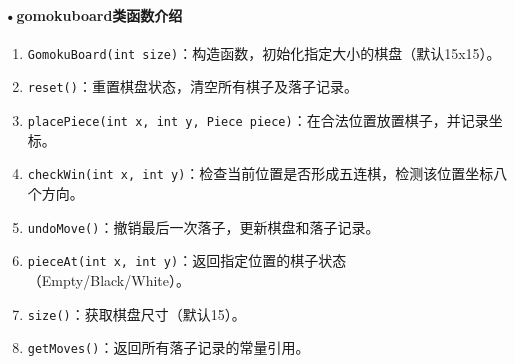 \documentclass[UTF8]{ctexart}
\begin{document}
\paragraph{•gomokuboard类函数介绍}
\begin{enumerate}
    \item \texttt{GomokuBoard(int size)}：构造函数，初始化指定大小的棋盘（默认15x15）。
    \item \texttt{reset()}：重置棋盘状态，清空所有棋子及落子记录。
    \item \texttt{placePiece(int x, int y, Piece piece)}：在合法位置放置棋子，并记录坐标。
    \item \texttt{checkWin(int x, int y)}：检查当前位置是否形成五连棋，检测该位置坐标八个方向。
    \item \texttt{undoMove()}：撤销最后一次落子，更新棋盘和落子记录。
    \item \texttt{pieceAt(int x, int y)}：返回指定位置的棋子状态（Empty/Black/White）。
    \item \texttt{size()}：获取棋盘尺寸（默认15）。
    \item \texttt{getMoves()}：返回所有落子记录的常量引用。
\end{enumerate}
\end{document}
